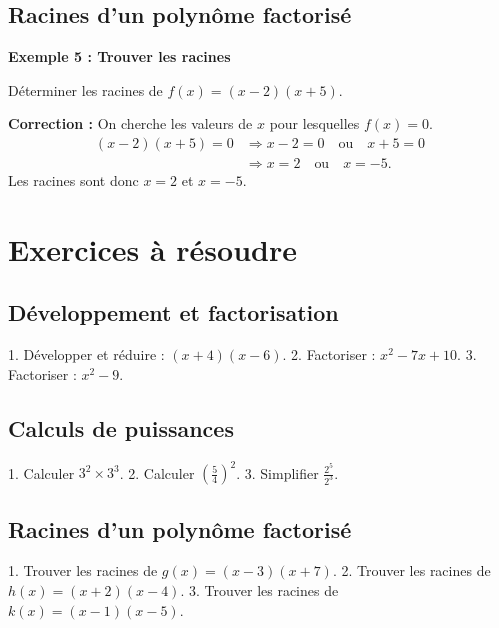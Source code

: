 \documentclass[a4paper,11pt]{article}
\begin{document}
\subsection{Racines d'un polynôme factorisé}

\textbf{Exemple 5 : Trouver les racines}

Déterminer les racines de $f(x) = (x - 2)(x + 5)$.

\textbf{Correction :}
On cherche les valeurs de $x$ pour lesquelles $f(x) = 0$.
\begin{align*}
(x - 2)(x + 5) = 0 &\Rightarrow x - 2 = 0 \quad \text{ou} \quad x + 5 = 0 \\
&\Rightarrow x = 2 \quad \text{ou} \quad x = -5.
\end{align*}
Les racines sont donc $x = 2$ et $x = -5$.

\section{Exercices à résoudre}

\subsection{Développement et factorisation}
1. Développer et réduire : $(x+4)(x-6)$.
2. Factoriser : $x^2 - 7x + 10$.
3. Factoriser : $x^2 - 9$.

\subsection{Calculs de puissances}
1. Calculer $3^2 \times 3^3$.
2. Calculer $\left(\frac{5}{4}\right)^2$.
3. Simplifier $\frac{2^5}{2^3}$.

\subsection{Racines d'un polynôme factorisé}
1. Trouver les racines de $g(x) = (x - 3)(x + 7)$.
2. Trouver les racines de $h(x) = (x + 2)(x - 4)$.
3. Trouver les racines de $k(x) = (x - 1)(x - 5)$.
\end{document}
